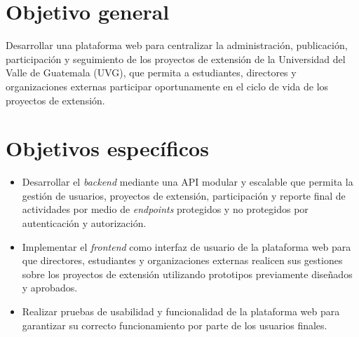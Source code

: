 \section{Objetivo general}
Desarrollar una plataforma web para centralizar la administración, publicación, participación y seguimiento de los proyectos
de extensión de la Universidad del Valle de Guatemala (UVG), que permita a estudiantes, directores y organizaciones
externas participar oportunamente en el ciclo de vida de los proyectos de extensión.

\section{Objetivos específicos}
\begin{itemize}
\item Desarrollar el \textit{backend} mediante una API modular y escalable que permita la gestión de usuarios, proyectos de extensión, participación y reporte final de actividades por medio de \textit{endpoints} protegidos y no protegidos por autenticación y autorización.
\item Implementar el \textit{frontend} como interfaz de usuario de la plataforma web para que directores, estudiantes y organizaciones externas realicen sus gestiones sobre los proyectos de extensión utilizando prototipos previamente diseñados y aprobados.
\item Realizar pruebas de usabilidad y funcionalidad de la plataforma web para garantizar su correcto funcionamiento por parte de los usuarios finales.
\end{itemize}